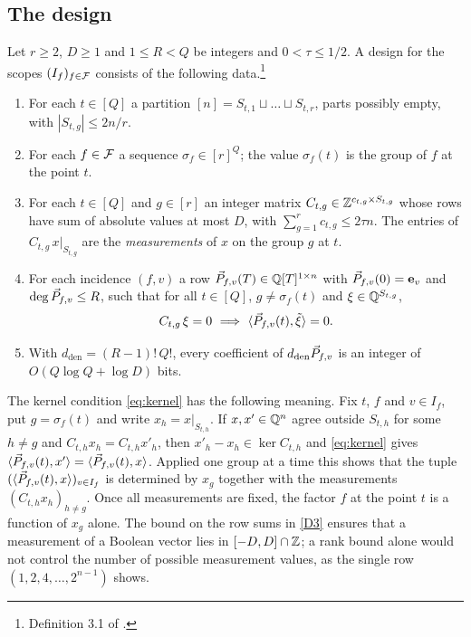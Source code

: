 \subsection{The design}
\begin{definition}[Design]\label{def:design}
Let $r\ge2$, $D\ge1$ and $1\le R<Q$ be integers and $0<\tau\le1/2$. A design for
the scopes $(I_f)_{f\in\mathcal{F}}$ consists of the following data.\footnote{Definition 3.1
of \cite{OAI26}.}
\begin{enumerate}[label=(D\arabic*),leftmargin=2.8em]
\item\label{D1} For each $t\in[Q]$ a partition $[n]=S_{t,1}\sqcup\dots\sqcup S_{t,r}$, parts
possibly empty, with $|S_{t,g}|\le 2n/r$.
\item\label{D2} For each $f\in\mathcal{F}$ a sequence $\sigma_f\in[r]^{Q}$; the value
$\sigma_f(t)$ is the group of $f$ at the point $t$.
\item\label{D3} For each $t\in[Q]$ and $g\in[r]$ an integer matrix
$C_{t,g}\in\mathbb{Z}^{c_{t,g}\times S_{t,g}}$ whose rows have sum of absolute values at
most $D$, with $\sum_{g=1}^{r}c_{t,g}\le 2\tau n$. The entries of
$C_{t,g}\,x|_{S_{t,g}}$ are the \emph{measurements} of $x$ on the group $g$ at
$t$.
\item\label{D4} For each incidence $(f,v)$ a row $\vec{P}_{f,v}(T)\in\mathbb{Q}[T]^{1\times n}$
with $\vec{P}_{f,v}(0)=\mathbf{e}_v$ and $\deg\vec{P}_{f,v}\le R$, such that for all $t\in[Q]$,
$g\ne\sigma_f(t)$ and $\xi\in\mathbb{Q}^{S_{t,g}}$,
\begin{equation}\label{eq:kernel}
  C_{t,g}\,\xi=0\ \Longrightarrow\ \langle \vec{P}_{f,v}(t),\tilde\xi\rangle=0 .
\end{equation}
\item\label{D5} With $d_{\mathrm{den}}=(R-1)!\,Q!$, every coefficient of
$d_{\mathrm{den}}\vec{P}_{f,v}$ is an integer of $O(Q\log Q+\log D)$ bits.
\end{enumerate}
\end{definition}

The kernel condition \eqref{eq:kernel} has the following meaning. Fix $t$, $f$
and $v\in I_f$, put $g=\sigma_f(t)$ and write $x_h=x|_{S_{t,h}}$. If $x,x'\in\mathbb{Q}^n$
agree outside $S_{t,h}$ for some $h\ne g$ and $C_{t,h}x_h=C_{t,h}x'_h$, then
$x'_h-x_h\in\ker C_{t,h}$ and \eqref{eq:kernel} gives
$\langle \vec{P}_{f,v}(t),x'\rangle=\langle \vec{P}_{f,v}(t),x\rangle$. Applied one group at a time this
shows that the tuple $(\langle \vec{P}_{f,v}(t),x\rangle)_{v\in I_f}$ is determined by $x_g$
together with the measurements $(C_{t,h}x_h)_{h\ne g}$. Once all measurements are
fixed, the factor $f$ at the point $t$ is a function of $x_g$ alone. The bound on
the row sums in \ref{D3} ensures that a measurement of a Boolean vector lies in
$[-D,D]\cap\mathbb{Z}$; a rank bound alone would not control the number of possible
measurement values, as the single row $(1,2,4,\dots,2^{n-1})$ shows.

